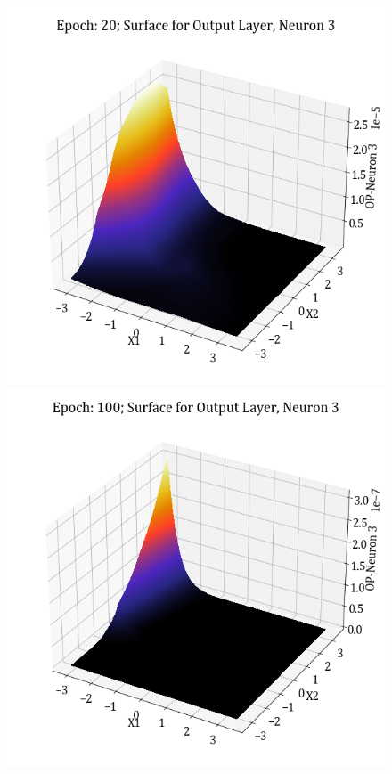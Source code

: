 \documentclass[11pt,a4paper]{article}
\begin{document}
\begin{figure}[H]
    \includegraphics[scale=0.4]{images/1B_MLFFNN_E20_OP_N3.png}
    \includegraphics[scale=0.4]{images/1B_MLFFNN_E100_OP_N3.png}

\end{figure}
\end{document}
